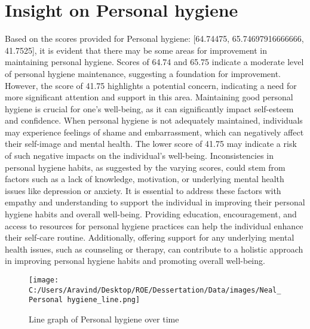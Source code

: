 \documentclass[10pt, a4paper]{article}%
\begin{document}
\section{Insight on Personal hygiene}%
\label{sec:InsightonPersonalhygiene}%
Based on the scores provided for Personal hygiene: {[}64.74475, 65.74697916666666, 41.7525{]}, it is evident that there may be some areas for improvement in maintaining personal hygiene. Scores of 64.74 and 65.75 indicate a moderate level of personal hygiene maintenance, suggesting a foundation for improvement. However, the score of 41.75 highlights a potential concern, indicating a need for more significant attention and support in this area.\newline%
\newline%
Maintaining good personal hygiene is crucial for one's well{-}being, as it can significantly impact self{-}esteem and confidence. When personal hygiene is not adequately maintained, individuals may experience feelings of shame and embarrassment, which can negatively affect their self{-}image and mental health. The lower score of 41.75 may indicate a risk of such negative impacts on the individual's well{-}being.\newline%
\newline%
Inconsistencies in personal hygiene habits, as suggested by the varying scores, could stem from factors such as a lack of knowledge, motivation, or underlying mental health issues like depression or anxiety. It is essential to address these factors with empathy and understanding to support the individual in improving their personal hygiene habits and overall well{-}being.\newline%
\newline%
Providing education, encouragement, and access to resources for personal hygiene practices can help the individual enhance their self{-}care routine. Additionally, offering support for any underlying mental health issues, such as counseling or therapy, can contribute to a holistic approach in improving personal hygiene habits and promoting overall well{-}being.%


\begin{figure}[H]%
\centering%
\texttt{[image: C:/Users/Aravind/Desktop/ROE/Dessertation/Data/images/Neal\_Personal hygiene\_line.png]}%
\caption{Line graph of Personal hygiene over time}%
\end{figure}

%
\end{document}
